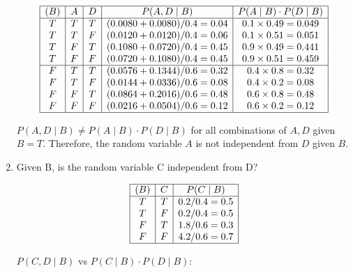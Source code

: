 \documentclass[12pt]{article}
\begin{document}
\begin{enumerate}[font=\Large,label=(\alph*)]
	      $$
		      \begin{array}{|c|c|c|c|c|}
			      \hline
			      (B) & A & D & P(A, D \mid B)               & P(A \mid B) \cdot P(D \mid B) \\
			      \hline
			      T   & T & T & (0.0080 + 0.0080)/0.4 = 0.04 & 0.1 \times 0.49 = 0.049       \\
			      T   & T & F & (0.0120 + 0.0120)/0.4 = 0.06 & 0.1 \times 0.51 = 0.051       \\
			      T   & F & T & (0.1080 + 0.0720)/0.4 = 0.45 & 0.9 \times 0.49 = 0.441       \\
			      T   & F & F & (0.0720 + 0.1080)/0.4 = 0.45 & 0.9 \times 0.51 = 0.459       \\
			      \hline
			      F   & T & T & (0.0576 + 0.1344)/0.6 = 0.32 & 0.4 \times 0.8 = 0.32         \\
			      F   & T & F & (0.0144 + 0.0336)/0.6 = 0.08 & 0.4 \times 0.2 = 0.08         \\
			      F   & F & T & (0.0864 + 0.2016)/0.6 = 0.48 & 0.6 \times 0.8 = 0.48         \\
			      F   & F & F & (0.0216 + 0.0504)/0.6 = 0.12 & 0.6 \times 0.2 = 0.12         \\
			      \hline
		      \end{array}
	      $$

	      $P(A, D \mid B) \neq P(A \mid B) \cdot P(D \mid B)$ for all combinations of $A,D$ given $B=T$. Therefore, the random variable $A$ is not independent from $D$ given $B$.

	\item Given B, is the random variable C independent from D?

	      $$
		      \begin{array}{|c|c|c|}
			      \hline
			      (B) & C & P(C \mid B) \\
			      \hline
			      T   & T & 0.2/0.4=0.5 \\
			      T   & F & 0.2/0.4=0.5 \\
			      F   & T & 1.8/0.6=0.3 \\
			      F   & F & 4.2/0.6=0.7 \\
			      \hline
		      \end{array}
	      $$

	      $P(C, D \mid B)$ vs $P(C \mid B) \cdot P(D \mid B):$


\end{enumerate}
\end{document}
